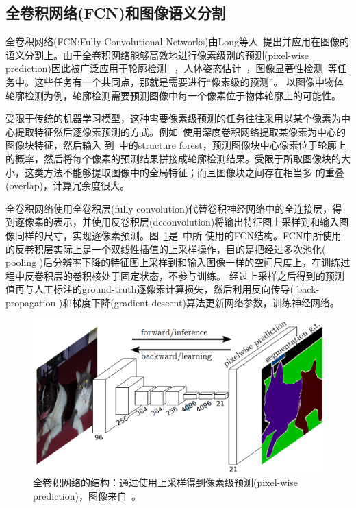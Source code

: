 \documentclass[UTF8]{ctexart}
\numberwithin{equation}{section} %
\numberwithin{table}{section} %
\begin{document}
\subsection{全卷积网络(FCN)和图像语义分割}
全卷积网络(FCN:Fully Convolutional Networks)由Long等人~\cite{long2015fully}提出并应用在图像的语义分割上。由于全卷积网络能够高效地进行像素级别的预测(pixel-wise prediction)因此被广泛应用于轮廓检测
~\cite{xie2015holistically,liu2016richer}，人体姿态估计~\cite{bulat2016human,newell2016stacked}，图像显著性检测~\cite{wang2016saliency}等任务中。这些任务有一个共同点，那就是需要进行“像素级的预测”。
以图像中物体轮廓检测为例，轮廓检测需要预测图像中每一个像素位于物体轮廓上的可能性。

受限于传统的机器学习模型，这种需要像素级预测的任务往往采用以某个像素为中心提取特征然后逐像素预测的方式。例如~\cite{shen2015deepcontour}使用深度卷积网络提取某像素为中心的图像块特征，然后输入
到~\cite{dollar2015fast}中的structure forest，预测图像块中心像素位于轮廓上的概率，然后将每个像素的预测结果拼接成轮廓检测结果。受限于所取图像块的大小，这类方法不能够提取图像中的全局特征；而且图像块之间存在相当多
的重叠(overlap)，计算冗余度很大。

全卷积网络使用全卷积层(fully convolution)代替卷积神经网络中的全连接层，得到逐像素的表示，并使用反卷积层(deconvolution)将输出特征图上采样到和输入图像同样的尺寸，实现逐像素预测。图~\ref{fig:long_fcn}是~\cite{long2015fully}中所
使用的FCN结构。FCN中所使用的反卷积层实际上是一个双线性插值的上采样操作，目的是把经过多次池化( pooling )后分辨率下降的特征图上采样到和输入图像一样的空间尺度上，在训练过程中反卷积层的卷积核处于固定状态，不参与训练。
经过上采样之后得到的预测值再与人工标注的ground-truth逐像素计算损失，然后利用反向传导( back-propagation )和梯度下降(gradient descent)算法更新网络参数，训练神经网络。

\begin{figure}[!htb]
\centering
\includegraphics[scale=0.2]{figures/fcn_arch.png}
\caption{全卷积网络的结构：通过使用上采样得到像素级预测(pixel-wise prediction)，图像来自~\cite{long2015fully}。}
\label{fig:long_fcn}
\end{figure}
\end{document}
